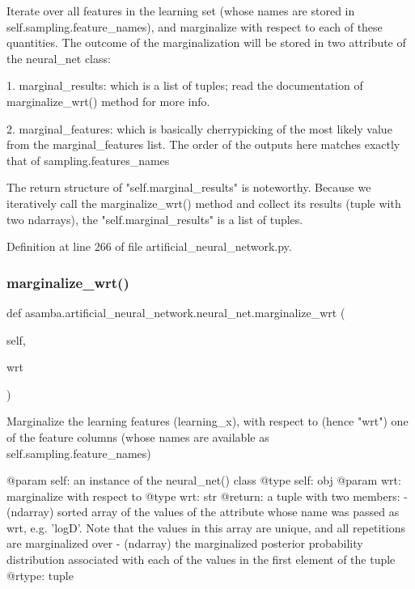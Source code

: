 \begin{DoxyVerb}Iterate over all features in the learning set (whose names are stored in self.sampling.feature_names),
and marginalize with respect to each of these quantities. The outcome of the marginalization will be stored in
two attribute of the neural_net class:

1. marginal_results: which is a list of tuples; read the documentation of marginalize_wrt() method for more info.

2. marginal_features: which is basically cherrypicking of the most likely value from the marginal_features list.
   The order of the outputs here matches exactly that of sampling.features_names

The return structure of "self.marginal_results" is noteworthy. Because we iteratively call the
marginalize_wrt() method and collect its results (tuple with two ndarrays), the "self.marginal_results"
is a list of tuples.
\end{DoxyVerb}
 

Definition at line 266 of file artificial\+\_\+neural\+\_\+network.\+py.

\mbox{\label{classasamba_1_1artificial__neural__network_1_1neural__net_a6c9272cb29ab3220ad19ffd3d35495a7}} 
\subsubsection{\texorpdfstring{marginalize\+\_\+wrt()}{marginalize\_wrt()}}
{\footnotesize\ttfamily def asamba.\+artificial\+\_\+neural\+\_\+network.\+neural\+\_\+net.\+marginalize\+\_\+wrt (\begin{DoxyParamCaption}\item[{}]{self,  }\item[{}]{wrt }\end{DoxyParamCaption})}

\begin{DoxyVerb}Marginalize the learning features (learning_x), with respect to (hence "wrt") one of the feature columns (whose names
are available as self.sampling.feature_names)

@param self: an instance of the neural_net() class
@type self: obj
@param wrt: marginalize with respect to
@type wrt: str
@return: a tuple with two members:
 - (ndarray) sorted array of the values of the attribute whose name was passed as wrt, e.g. 'logD'. Note that
   the values in this array are unique, and all repetitions are marginalized over
 - (ndarray) the marginalized posterior probability distribution associated with each of the values in the
   first element of the tuple
@rtype: tuple
\end{DoxyVerb}
 

